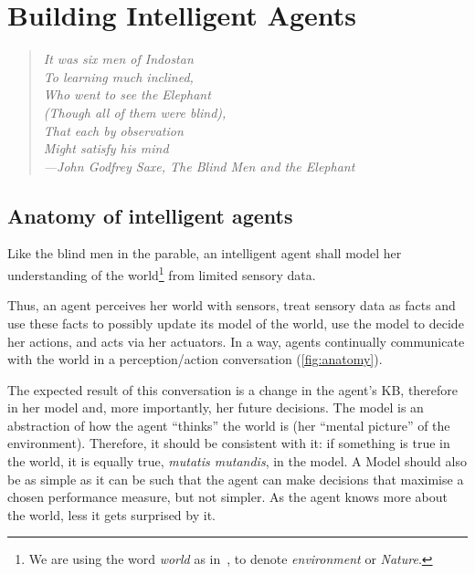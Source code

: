 \section{Building Intelligent Agents}
\vspace{0.5cm}
\begin{quotation}
	\centering \small \emph{ It was six men of Indostan\\
	To learning much inclined,\\
	Who went to see the Elephant\\
	(Though all of them were blind),\\
	That each by observation\\
	Might satisfy his mind\\
	\flushright{} ---John Godfrey Saxe, The Blind Men and the Elephant~\cite{saxe:2016}\label{blind_men}\\
	}
\end{quotation}
\subsection{Anatomy of intelligent agents}\label{sec:anatomy_ia}

Like the blind men in the parable, an intelligent agent shall model her understanding of the world\footnote{We are using the word \emph{world} as in~, to denote \emph{environment} or \emph{Nature}.} from limited sensory data.


Thus, an agent perceives her world with sensors, treat sensory data as facts and use these facts to possibly update its model of the world, use the model to decide her actions, and acts via her actuators. In a way, agents continually communicate with the world in a perception/action conversation (\cref{fig:anatomy}).

The expected result of this conversation is a change in the agent's \acf{KB}, therefore in her model and, more importantly, her future decisions. The model is an abstraction of how the agent ``thinks'' the world is (her ``mental picture'' of the environment). Therefore, it should be consistent with it: if something is true in the world, it is equally true, \emph{mutatis mutandis}, in the model. A Model should also be as simple as it can be such that the agent can make decisions that maximise a chosen performance measure, but not simpler. As the agent knows more about the world, less it gets surprised by it.

